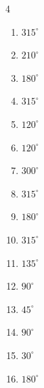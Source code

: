 \begin{multicols}{4}
\begin{enumerate}
  \item $\displaystyle 315^{\circ}$

  \item $\displaystyle 210^{\circ}$

  \item $\displaystyle 180^{\circ}$
        \phantom{$\displaystyle =\pi$}

  \item $\displaystyle 315^{\circ}$

  \item $\displaystyle 120^{\circ}$

  \item $\displaystyle 120^{\circ}$

  \item $\displaystyle 300^{\circ}$

  \item $\displaystyle 315^{\circ}$

  \item $\displaystyle 180^{\circ}$
        \phantom{$\displaystyle =\pi$}

\columnbreak %

  \item $\displaystyle 315^{\circ}$

  \item $\displaystyle 135^{\circ}$

  \item $\displaystyle 90^{\circ}$

  \item $\displaystyle 45^{\circ}$

  \item $\displaystyle 90^{\circ}$

  \item $\displaystyle 30^{\circ}$

  \item $\displaystyle 180^{\circ}$
        \phantom{$\displaystyle =\pi$}


\end{enumerate}
\end{multicols}
